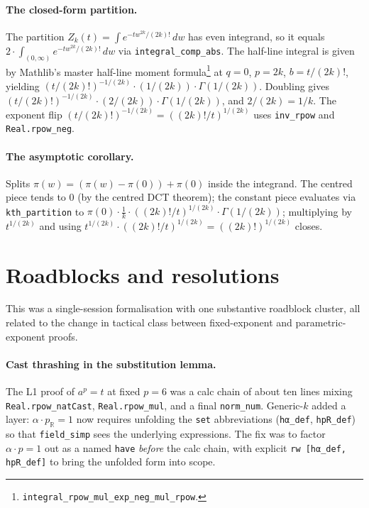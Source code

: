 \documentclass[11pt]{article}
\begin{document}
\paragraph{The closed-form partition.} The partition
$Z_k(t) = \int e^{-tw^{2k}/(2k)!}\,dw$ has even integrand, so it
equals $2 \cdot \int_{(0,\infty)} e^{-tw^{2k}/(2k)!}\,dw$ via
\texttt{integral\_comp\_abs}. The half-line integral is given by
Mathlib's master half-line moment formula\footnote{%
\texttt{integral\_rpow\_mul\_exp\_neg\_mul\_rpow}.} at
$q = 0$, $p = 2k$, $b = t/(2k)!$, yielding
$(t/(2k)!)^{-1/(2k)} \cdot (1/(2k)) \cdot \Gamma(1/(2k))$. Doubling
gives $(t/(2k)!)^{-1/(2k)} \cdot (2/(2k)) \cdot \Gamma(1/(2k))$, and
$2/(2k) = 1/k$. The exponent flip
$(t/(2k)!)^{-1/(2k)} = ((2k)!/t)^{1/(2k)}$ uses \texttt{inv\_rpow}
and \texttt{Real.rpow\_neg}.

\paragraph{The asymptotic corollary.} Splits
$\pi(w) = (\pi(w) - \pi(0)) + \pi(0)$ inside the integrand. The
centred piece tends to $0$ (by the centred DCT theorem); the
constant piece evaluates via \texttt{kth\_partition} to
$\pi(0)\cdot \tfrac{1}{k}\cdot ((2k)!/t)^{1/(2k)}\cdot \Gamma(1/(2k))$;
multiplying by $t^{1/(2k)}$ and using
$t^{1/(2k)} \cdot ((2k)!/t)^{1/(2k)} = ((2k)!)^{1/(2k)}$ closes.

\section{Roadblocks and resolutions}

This was a single-session formalisation with one substantive
roadblock cluster, all related to the change in tactical class
between fixed-exponent and parametric-exponent proofs.

\paragraph{Cast thrashing in the substitution lemma.} The L1 proof
of $a^p = t$ at fixed $p = 6$ was a calc chain of about ten lines
mixing \texttt{Real.rpow\_natCast}, \texttt{Real.rpow\_mul}, and a
final \texttt{norm\_num}. Generic-$k$ added a layer:
$\alpha \cdot p_{\mathbb R} = 1$ now requires unfolding the
\texttt{set} abbreviations (\texttt{hα\_def}, \texttt{hpR\_def}) so
that \texttt{field\_simp} sees the underlying expressions. The fix
was to factor $\alpha \cdot p = 1$ out as a named \texttt{have}
\emph{before} the calc chain, with explicit \texttt{rw [hα\_def, hpR\_def]} to bring the
unfolded form into scope.
\end{document}
